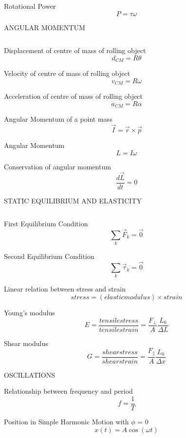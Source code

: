 \documentclass[12pt, letterpaper, twoside]{article}
\begin{document}
Rotational Power
$$ P = \tau \omega $$











\newpage



ANGULAR MOMENTUM

$$ $$



Displacement of centre of mass of rolling object
$$ d_{CM} = R \theta $$


Velocity of centre of mass of rolling object
$$ v_{CM} = R \omega $$


Acceleration of centre of mass of rolling object
$$ a_{CM} = R \alpha $$


Angular Momentum of a point mass
$$ \overrightarrow{I} = \overrightarrow{r} \times \overrightarrow{p} $$


Angular Momentum
$$  L = I \omega $$


Conservation of angular momentum
$$  \frac{d \overrightarrow{L}}{dt} = 0  $$





\newpage


STATIC EQUILIBRIUM AND ELASTICITY

$$ $$


First Equilibrium Condition
$$ \sum_k \overrightarrow{F}_k = \overrightarrow{0} $$


Second Equilibrium Condition
$$ \sum_k \overrightarrow{\tau}_k = \overrightarrow{0} $$


Linear relation between stress and strain
$$ stress = (elastic modulus) \times strain $$


Young's modulus
$$  E = \frac{tensile stress}{tensile strain} = \frac{F_\bot}{A} \frac{L_0}{\Delta L} $$


Shear modulus
$$  G = \frac{shear stress}{shear strain} = \frac{F_\parallel}{A} \frac{L_0}{\Delta x} $$





\newpage

OSCILLATIONS
$$ $$



Relationship between frequency and period
$$ f = \frac{1}{T} $$

Position in Simple Harmonic Motion with $\phi$ = 0
$$ x(t) = A \cos (\omega t) $$
\end{document}
